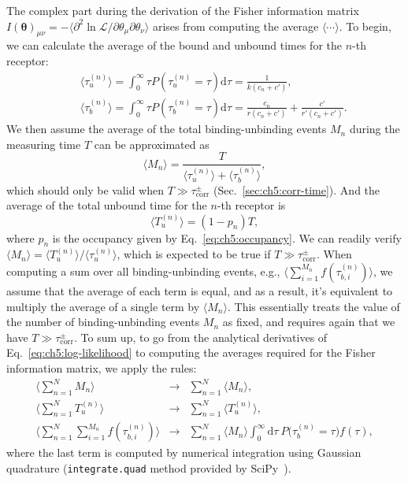 The complex part during the derivation of the Fisher information matrix $I(\boldsymbol{\theta})_{\mu\nu}=-\langle\partial^2\ln\mathcal{L}/\partial\theta_\mu\partial\theta_\nu\rangle$ arises from computing the average $\langle\cdots\rangle$.
To begin, we can calculate the average of the bound and unbound times for the $n$-th receptor:
\begin{eqnarray}
&&\langle\tau_{u}^{(n)}\rangle=\int_0^\infty\tau P(\tau_u^{(n)} =\tau)\mathrm{d}\tau=\frac{1}{k(c_n+c')},\nonumber\\
&&\langle\tau_{b}^{(n)}\rangle=\int_0^\infty\tau P(\tau_b^{(n)} =\tau)\mathrm{d}\tau=\frac{c_n}{r(c_n+c')}+\frac{c'}{r'(c_n+c')}.\nonumber
\end{eqnarray}
We then assume the average of the total binding-unbinding events $M_n$ during the measuring time $T$ can be approximated as
\begin{equation}
    \langle M_n\rangle = \frac{T}{\langle\tau_{u}^{(n)}\rangle + \langle\tau_{b}^{(n)}\rangle},
\end{equation}
which should only be valid when $T\gg\tau_\textrm{corr}^\pm$ (Sec.~\ref{sec:ch5:corr-time}).
And the average of the total unbound time for the $n$-th receptor is
\begin{equation}
    \langle T_u^{(n)}\rangle=(1-p_n)T,
\end{equation}
where $p_n$ is the occupancy given by Eq.~\eqref{eq:ch5:occupancy}.
We can readily verify $\langle M_n\rangle = {\langle T_u^{(n)}\rangle}/{\langle \tau_u^{(n)}\rangle}$, which is expected to be true if $T\gg\tau_\textrm{corr}^\pm$.
When computing a sum over all binding-unbinding events, e.g., $\langle\sum_{i=1}^{M_n} f(\tau_{b,i}^{(n)}) \rangle$, we assume that the average of each term is equal, and as a result, it's equivalent to multiply the average of a single term by $\langle M_n\rangle$.
This essentially treats the value of the number of binding-unbinding events $M_n$ as fixed, and requires again that we have $T \gg \tau_\textrm{corr}^\pm$.
To sum up, to go from the analytical derivatives of Eq.~\eqref{eq:ch5:log-likelihood} to computing the averages required for the Fisher information matrix, we apply the rules:
\begin{eqnarray}
    \langle\sum_{n=1}^N M_n\rangle&\to&\sum_{n=1}^N\langle M_n\rangle,\nonumber\\
    \langle\sum_{n=1}^N T_u^{(n)}\rangle&\to&\sum_{n=1}^N \langle T_u^{(n)}\rangle,\label{eq:ch5:avg-approx}\\
    \langle\sum_{n=1}^N\sum_{i=1}^{M_n}f(\tau_{b,i}^{(n)})\rangle&\to&\sum_{n=1}^N\langle M_n\rangle\int_0^\infty\mathrm{d}\tau ~P\bm{(}\tau_b^{(n)}=\tau\bm{)} f(\tau),\nonumber
\end{eqnarray}
where the last term is computed by numerical integration using Gaussian quadrature (\texttt{integrate.quad} method provided by SciPy~\cite{virtanen2020scipy}).


